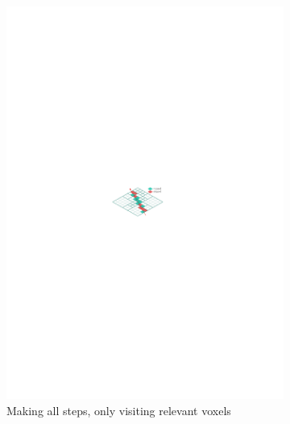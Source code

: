 \begin{figure}[ht]
\begin{subfigure}{.33\textwidth}
  \includegraphics[scale=1]{figures/emptyspace_skip1.pdf}
  \caption{Making all steps, only visiting \newline relevant voxels}
  \label{fig:emptyspace2}
\end{subfigure}
\begin{subfigure}{.33\textwidth}
  \centering

\end{subfigure}
\end{figure}
